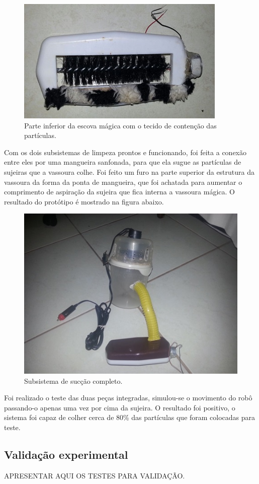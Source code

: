 		\begin{figure}[H]
			\centering
			\includegraphics[scale=1]{figuras/asppc2_12.jpg}
			\caption{Parte inferior da escova mágica com o tecido de contenção das partículas.}
			\label{img:escova_com_tecido}
		\end{figure}

		Com os dois subsistemas de limpeza prontos e funcionando, foi feita a conexão entre eles por uma mangueira sanfonada, para que ela sugue as partículas de sujeiras que a vassoura colhe. Foi feito um furo na parte superior da estrutura da vassoura da forma da ponta de mangueira, que foi achatada para aumentar o comprimento de aspiração da sujeira que fica interna a vassoura mágica. O resultado do protótipo é mostrado na figura abaixo.

		\begin{figure}[H]
			\centering
			\includegraphics[scale=1]{figuras/asppc2_13.jpg}
			\caption{Subsistema de sucção completo.}
			\label{img:sistema_completo}
		\end{figure}

		Foi realizado o teste das duas peças integradas, simulou-se o movimento do robô passando-o apenas uma vez por cima da sujeira. O resultado foi positivo, o sistema foi capaz de colher cerca de 80\% das partículas que foram colocadas para teste.

\subsection{Validação experimental} %
	\label{sub:validação_experimental}

	APRESENTAR AQUI OS TESTES PARA VALIDAÇÃO.